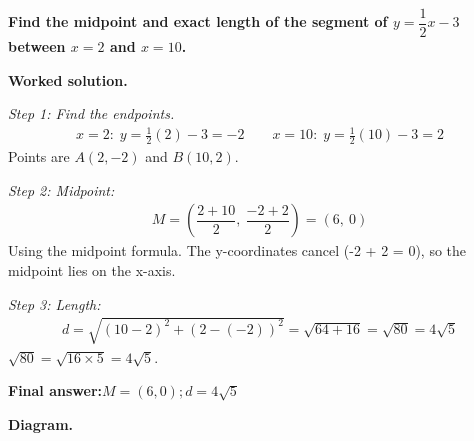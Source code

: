 \documentclass[11pt]{article}
\newcommand{\question}[1]{\par\medskip\noindent\textbf{#1}\par}
\begin{document}
\question{Find the midpoint and exact length of the segment of \( y = \dfrac{1}{2}x - 3 \) between \( x = 2 \) and \( x = 10 \).}

\textbf{Worked solution.}

\textit{Step 1: Find the endpoints.}
\[\begin{gathered}
x = 2:\; y = \tfrac{1}{2}(2) - 3 = -2 \qquad x = 10:\; y = \tfrac{1}{2}(10) - 3 = 2
\end{gathered}\]
Points are \( A(2, -2) \) and \( B(10, 2) \).

\textit{Step 2: Midpoint:}
\[\begin{gathered}
M = \left(\dfrac{2 + 10}{2},\ \dfrac{-2 + 2}{2}\right) = (6,\ 0)
\end{gathered}\]
Using the midpoint formula. The y-coordinates cancel (-2 + 2 = 0), so the midpoint lies on the x-axis.

\textit{Step 3: Length:}
\[\begin{gathered}
d = \sqrt{(10 - 2)^2 + (2 - (-2))^2} = \sqrt{64 + 16} = \sqrt{80} = 4\sqrt{5}
\end{gathered}\]
\(\sqrt{80} = \sqrt{16 \times 5} = 4\sqrt{5}\).

\begin{answerbox}
\textbf{Final answer:}\quad \(\displaystyle M = (6, 0) ;  d = 4\sqrt{5}\)
\end{answerbox}
\textbf{Diagram.}
\end{document}
